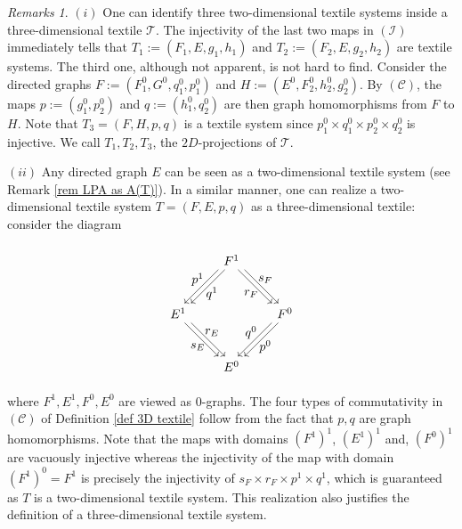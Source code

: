 \documentclass[a4paper,reqno,12pt]{amsart}
\theoremstyle{definition}
\theoremstyle{remark}
\newtheorem{rmks}[thm]{Remarks}
\begin{document}
\begin{rmks}\label{rem vieweing 2D textile as a 3D textile}
$(i)$ One can identify three two-dimensional textile systems inside a three-dimensional textile $\mathcal{T}$. The injectivity of the last two maps in $(\mathcal{I})$ immediately tells that $T_1:=(F_1,E,g_1,h_1)$ and $T_2:=(F_2,E,g_2,h_2)$ are textile systems. The third one, although not apparent, is not hard to find. Consider the directed graphs $F:=(F_1^0,G^0,q_1^0,p_1^0)$ and $H:=(E^0,F_2^0,h_2^0,g_2^0)$. By $(\mathcal{C})$, the maps $p:=(g_1^0,p_2^0)$ and $q:=(h_1^0,q_2^0)$ are then graph homomorphisms from $F$ to $H$. Note that $T_3=(F,H,p,q)$ is a textile system since $p_1^0\times q_1^0\times p_2^0\times q_2^0$ is injective. We call $T_1,T_2,T_3$, the $2D$-projections of $\mathcal{T}$.

$(ii)$ Any directed graph $E$ can be seen as a two-dimensional textile system (see Remark \ref{rem LPA as A(T)}). In a similar manner, one can realize a two-dimensional textile system $T=(F,E,p,q)$ as a three-dimensional textile: consider the diagram 

\[
\begin{tikzpicture}[scale=1]
\node[inner sep=2.5pt, circle] (B) at (-1.5,0) {$E^1$};
\node[inner sep=2.5pt, circle] (C) at (1.5,0) {$F^0$};	
\node[inner sep=2.5pt, circle] (D) at (0,-1.5) {$E^0$};
\node[inner sep=2.5pt, circle] (A) at (0,1.5) {$F^1$}; 

\draw[transform canvas={xshift=0.6ex}, ->] (A) -- (B);
\draw[transform canvas={xshift=-0.6ex}, ->] (A) -- (B);

\draw[transform canvas={xshift=0.6ex}, ->] (A) -- (C);
\draw[transform canvas={xshift=-0.6ex}, ->] (A) -- (C);

\draw[transform canvas={xshift=0.6ex}, ->] (C) -- (D);
\draw[transform canvas={xshift=-0.6ex}, ->] (C) -- (D);

\draw[transform canvas={xshift=0.6ex}, ->] (B) -- (D);
\draw[transform canvas={xshift=-0.6ex}, ->] (B) -- (D);

\node at (-0.55,0.55) {$q^1$};
\node at (-0.95,0.95) {$p^1$};

\node at (0.55,0.55) {$r_F$};
\node at (0.95,0.95) {$s_F$};

\node at (-0.55,-0.55) {$r_E$};
\node at (-0.95,-0.95) {$s_E$};

\node at (0.55,-0.55) {$q^0$};
\node at (0.95,-0.95) {$p^0$};
\end{tikzpicture}
\]
where $F^1,E^1,F^0,E^0$ are viewed as $0$-graphs. The four types of commutativity in $(\mathcal{C})$ of Definition \ref{def 3D textile} follow from the fact that $p,q$ are graph homomorphisms. Note that the maps with domains $(F^1)^1$, $(E^1)^1$ and, $(F^0)^1$ are vacuously injective whereas the injectivity of the map with domain $(F^1)^0=F^1$ is precisely the injectivity of $s_F\times r_F\times p^1\times q^1$, which is guaranteed as $T$ is a two-dimensional textile system. This realization also justifies the definition of a three-dimensional textile system.
\end{rmks}
\end{document}
